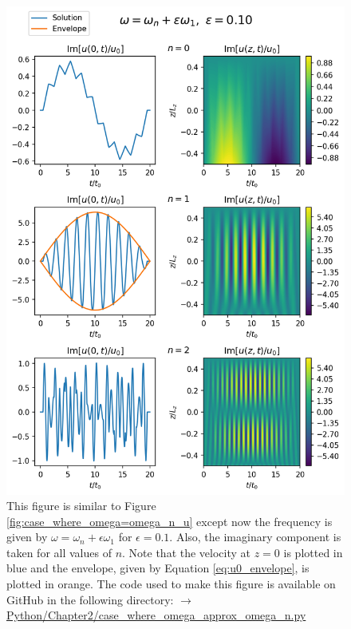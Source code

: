 \begin{figure}
    \centering
    \vspace{-20pt}
    \includegraphics[width=\textwidth,height=0.85\textheight,keepaspectratio]{figures/chapter02/case_where_omega_approx_omega_n_u.png}
    \vspace{-10pt}
    \caption{This figure is similar to Figure \ref{fig:case_where_omega=omega_n_u} except now the frequency is given by $\omega=\omega_n+\epsilon \omega_1$ for $\epsilon=0.1$. Also, the imaginary component is taken for all values of $n$. Note that the velocity at $z=0$ is plotted in blue and the envelope, given by Equation \eqref{eq:u0_envelope}, is plotted in orange. The code used to make this figure is available on GitHub in the following directory:\newline
    \href{https://github.com/aleksyprok/apkp_thesis/blob/main/Python/Chapter2/case_where_omega_approx_omega_n.py}{$\rightarrow$ Python/Chapter2/case\_where\_omega\_approx\_omega\_n.py}}
    \label{fig:case_where_omega_approx_omega_n_u}
    \vspace{-30pt}
\end{figure}

